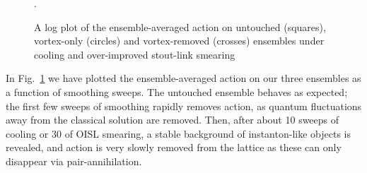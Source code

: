\documentclass[
 reprint,
 amsmath,amssymb,
 aps,
prd,
]{revtex4-1}
\begin{document}
\begin{figure}[thpb]
\caption{A log plot of the ensemble-averaged action on untouched (squares), vortex-only (circles) and vortex-removed (crosses) ensembles under cooling  and over-improved stout-link smearing }.
\label{Fig:ActvsSw}
\end{figure}
In Fig.~\ref{Fig:ActvsSw} we have plotted the ensemble-averaged action on our three ensembles as a function of smoothing sweeps. The untouched ensemble behaves as expected; the first few sweeps of smoothing rapidly removes action, as quantum fluctuations away from the classical solution are removed. Then, after about 10 sweeps of cooling or 30 of OISL smearing, a stable background of instanton-like objects is revealed, and action is very slowly removed from the lattice as these can only disappear via pair-annihilation. \par
\end{document}
